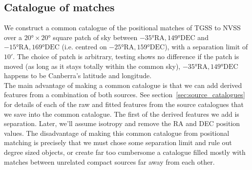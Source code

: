 \documentclass[12pt,a4paper]{article}
\begin{document}
\subsection{Catalogue of matches}
We construct a common catalogue of the positional matches of TGSS to NVSS over a $\ang{20}\times\ang{20}$ square patch of sky between $-\ang{35}\mathrm{RA}, \ang{149}\mathrm{DEC}$ and $-\ang{15}\mathrm{RA}, \ang{169}\mathrm{DEC}$ (i.e. centred on $-\ang{25}\mathrm{RA}, \ang{159}\mathrm{DEC}$), with a separation limit of $\ang{;10;}$. The choice of patch is arbitrary, testing shows no difference if the patch is moved (as long as it stays totally within the common sky), $-\ang{35}\mathrm{RA}, \ang{149}\mathrm{DEC}$ happens to be Canberra's latitude and longitude.\\

The main advantage of making a common catalogue is that we can add derived features from a combination of both sources.
See section~\ref{sec:source_catalogues} for details of each of the raw and fitted features from the source catalogues that we save into the common catalogue. The first of the derived features we add is separation. Later, we'll assume isotropy and remove the RA and DEC position values.
The disadvantage of making this common catalogue from positional matching is precisely that we must chose some separation limit and rule out degree sized objects, or create far too cumbersome a catalogue filled mostly with matches between unrelated compact sources far away from each other.
\end{document}
